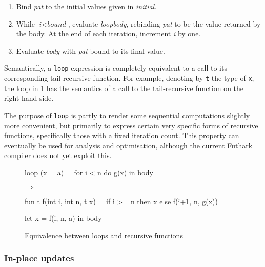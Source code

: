 \documentclass[oneside]{memoir}
\begin{document}
\begin{enumerate}
  \item Bind \textit{pat} to the initial values given in \textit{initial}.
  \item While $\textit{i} < \textit{bound}$, evaluate
    \textit{loopbody}, rebinding \textit{pat} to be the value returned
    by the body.  At the end of each iteration, increment \textit{i}
    by one.
  \item Evaluate \textit{body} with \textit{pat} bound to its final
    value.
\end{enumerate}
Semantically, a \texttt{loop} expression is completely equivalent to a
call to its corresponding tail-recursive function.  For example,
denoting by \texttt{t} the type of \texttt{x}, the loop in
\cref{fig:loop-recursion} has the semantics of a call to the
tail-recursive function on the right-hand side.

The purpose of \texttt{loop} is partly to render some sequential
computations slightly more convenient, but primarily to express
certain very specific forms of recursive functions, specifically those
with a fixed iteration count.  This property can eventually be used
for analysis and optimisation, although the current Futhark compiler
does not yet exploit this.

\begin{figure}
\begin{center}
\begin{minipage}{0.3\columnwidth}
\begin{colorcode}
loop (x = a) =
  for i < n do
    g(x)
in body
\end{colorcode}
\end{minipage}
\begin{minipage}{0.05\columnwidth}
$\Rightarrow$
\end{minipage}
\begin{minipage}{0.4\columnwidth}
\begin{colorcode}
fun t f(int i, int n, t x) =
  if i >= n then x
     else f(i+1, n, g(x))

let x = f(i, n, a)
in body
\end{colorcode}
\end{minipage}
\end{center}
\caption{Equivalence between loops and recursive functions}
\label{fig:loop-recursion}
\end{figure}

\subsubsection{In-place updates}
\label{sec:in-place-updates}
\end{document}
